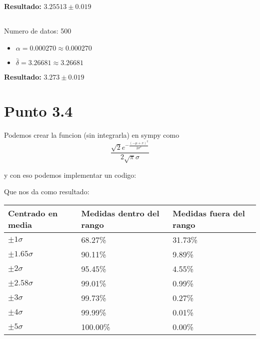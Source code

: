 \documentclass[12pt]{exam}
\begin{document}
\textbf{Resultado: }$3.25513 \pm 0.019$

\subsection{}

Numero de datos: 500

\begin{itemize}
  \item $\alpha = 0.000270 \approx 0.000270$
  \item $\bar{\delta} = 3.26681 \approx 3.26681$
\end{itemize}


\textbf{Resultado: }$3.273 \pm 0.019$

\section{Punto 3.4}

Podemos crear la funcion (sin integrarla) en sympy como
$$\frac{\sqrt{2} e^{- \frac{\left(- \mu + x\right)^{2}}{2 \sigma^{2}}}}{2 \sqrt{\pi} \sigma}$$

y con eso podemos implementar un codigo:



Que nos da como resultado:

\begin{tabular}{lll}
  \hline
  Centrado en media   & Medidas dentro del rango   & Medidas fuera del rango   \\
  \hline
  $\pm 1 \sigma$        & 68.27\%                     & 31.73\%                    \\
  $\pm 1.65 \sigma$     & 90.11\%                     & 9.89\%                     \\
  $\pm 2 \sigma$        & 95.45\%                     & 4.55\%                     \\
  $\pm 2.58 \sigma$     & 99.01\%                     & 0.99\%                     \\
  $\pm 3 \sigma$        & 99.73\%                     & 0.27\%                     \\
  $\pm 4 \sigma$        & 99.99\%                     & 0.01\%                     \\
  $\pm 5 \sigma$        & 100.00\%                    & 0.00\%                     \\
  \hline
\end{tabular}
\end{document}
